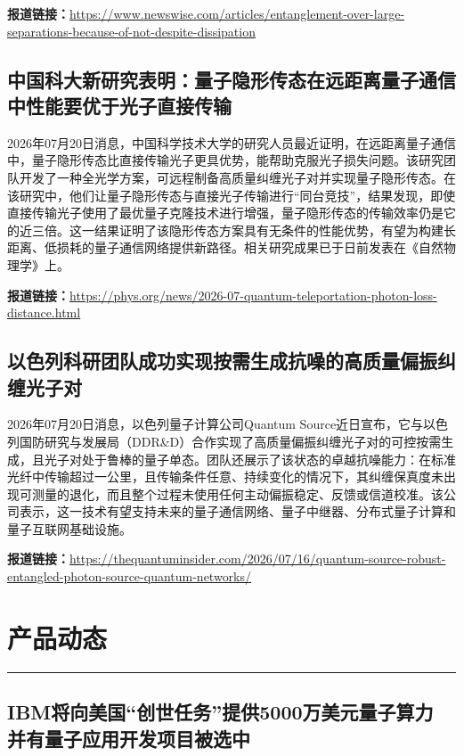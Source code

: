 \documentclass[12pt,a4paper]{ctexart}
\begin{document}
\noindent\textbf{报道链接：}\url{https://www.newswise.com/articles/entanglement-over-large-separations-because-of-not-despite-dissipation}

\subsection{ 中国科大新研究表明：量子隐形传态在远距离量子通信中性能要优于光子直接传输 }

2026年07月20日消息，中国科学技术大学的研究人员最近证明，在远距离量子通信中，量子隐形传态比直接传输光子更具优势，能帮助克服光子损失问题。该研究团队开发了一种全光学方案，可远程制备高质量纠缠光子对并实现量子隐形传态。在该研究中，他们让量子隐形传态与直接光子传输进行“同台竞技”，结果发现，即使直接传输光子使用了最优量子克隆技术进行增强，量子隐形传态的传输效率仍是它的近三倍。这一结果证明了该隐形传态方案具有无条件的性能优势，有望为构建长距离、低损耗的量子通信网络提供新路径。相关研究成果已于日前发表在《自然物理学》上。

\noindent\textbf{报道链接：}\url{https://phys.org/news/2026-07-quantum-teleportation-photon-loss-distance.html}

\subsection{ 以色列科研团队成功实现按需生成抗噪的高质量偏振纠缠光子对 }

2026年07月20日消息，以色列量子计算公司Quantum Source近日宣布，它与以色列国防研究与发展局（DDR\&D）合作实现了高质量偏振纠缠光子对的可控按需生成，且光子对处于鲁棒的量子单态。团队还展示了该状态的卓越抗噪能力：在标准光纤中传输超过一公里，且传输条件任意、持续变化的情况下，其纠缠保真度未出现可测量的退化，而且整个过程未使用任何主动偏振稳定、反馈或信道校准。该公司表示，这一技术有望支持未来的量子通信网络、量子中继器、分布式量子计算和量子互联网基础设施。

\noindent\textbf{报道链接：}\url{https://thequantuminsider.com/2026/07/16/quantum-source-robust-entangled-photon-source-quantum-networks/}


\newpage
\section{产品动态}
\vspace{-0.5em}
\noindent\rule{\linewidth}{1.5pt}

\subsection{ IBM将向美国“创世任务”提供5000万美元量子算力 并有量子应用开发项目被选中 }
\end{document}
